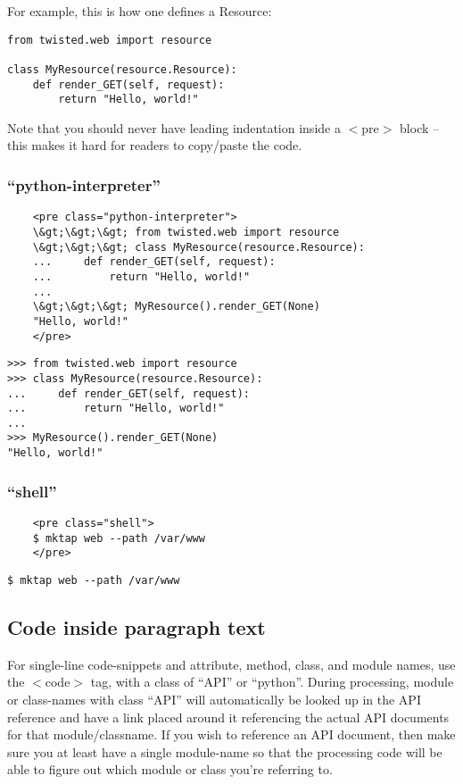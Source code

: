 For example, this is how one defines a Resource:\begin{verbatim}
from twisted.web import resource

class MyResource(resource.Resource):
    def render_GET(self, request):
        return "Hello, world!"
\end{verbatim}


Note that you should never have leading indentation inside a     $<$pre$>$ block -- this makes it hard for readers to     copy/paste the code.

\subsubsection{``python-interpreter''}
\begin{verbatim}
    <pre class="python-interpreter">
    \&gt;\&gt;\&gt; from twisted.web import resource
    \&gt;\&gt;\&gt; class MyResource(resource.Resource):
    ...     def render_GET(self, request):
    ...         return "Hello, world!"
    ...
    \&gt;\&gt;\&gt; MyResource().render_GET(None)
    "Hello, world!"
    </pre>
\end{verbatim}
\begin{verbatim}
>>> from twisted.web import resource
>>> class MyResource(resource.Resource):
...     def render_GET(self, request):
...         return "Hello, world!"
...
>>> MyResource().render_GET(None)
"Hello, world!"
\end{verbatim}


\subsubsection{``shell''}
\begin{verbatim}
    <pre class="shell">
    $ mktap web --path /var/www
    </pre>
\end{verbatim}
\begin{verbatim}
$ mktap web --path /var/www
\end{verbatim}


\subsection{Code inside paragraph text}


For single-line code-snippets and attribute, method, class,     and module names, use the $<$code$>$ tag, with a class of     ``API'' or ``python''. During processing, module or class-names     with class ``API'' will automatically be looked up in the API     reference and have a link placed around it referencing the     actual API documents for that module/classname. If you wish to     reference an API document, then make sure you at least have a     single module-name so that the processing code will be able to     figure out which module or class you're referring to.

